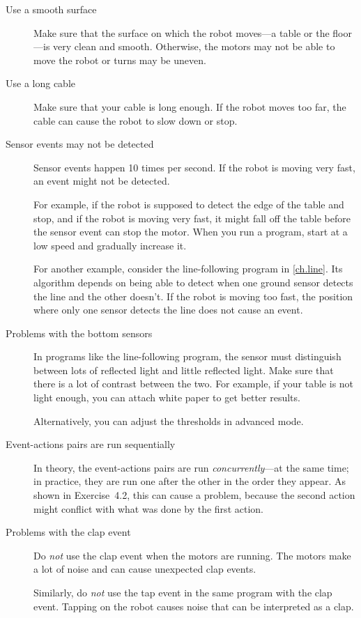 \begin{description}

\item[Use a smooth surface] Make sure that the surface on which the
robot moves---a table or the floor---is very clean and smooth.
Otherwise, the motors may not be able to move the robot or turns may be
uneven.

\item[Use a long cable] Make sure that your cable is long enough. If the
robot moves too far, the cable can cause the robot to slow down or stop.

\item[Sensor events may not be detected] Sensor events happen 10 times
per second. If the robot is moving very fast, an event might not be
detected.

For example, if the robot is supposed to detect the edge of the table
and stop, and if the robot is moving very fast, it might fall off the
table before the sensor event can stop the motor. When you run a
program, start at a low speed and gradually increase it.

For another example, consider the line-following program in
\cref{ch.line}. Its algorithm depends on being able to detect
when one ground sensor detects the line and the other doesn't. If the
robot is moving too fast, the position where only one sensor detects
the line does not cause an event.

\item[Problems with the bottom sensors] In programs like the
line-following program, the sensor must distinguish between lots of
reflected light and little reflected light. Make sure that there is a
lot of contrast between the two. For example, if your table is not light
enough, you can attach white paper to get better results.

Alternatively, you can adjust the thresholds in advanced mode.

\item[Event-actions pairs are run sequentially] In theory, the
event-actions pairs are run \emph{concurrently}---at the same time; in
practice, they are run one after the other in the order they appear. As
shown in Exercise~4.2, this can cause a problem, because the second
action might conflict with what was done by the first action.

\item[Problems with the clap event] Do \emph{not} use the clap event
 when the motors are running. The motors make a lot of
noise and can cause unexpected clap events.

Similarly, do \emph{not} use the tap event  in the same
program with the clap event. Tapping on the robot causes noise that can
be interpreted as a clap.

\end{description}
